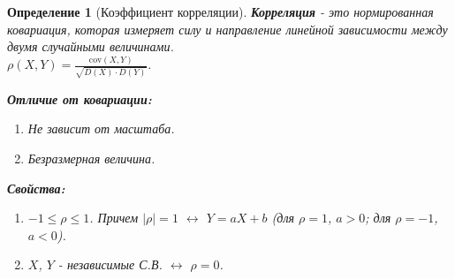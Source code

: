 \documentclass[14pt]{extarticle}
\theoremstyle{breakstyle}
\newtheorem{definition}{Определение}[subsection]
\begin{document}
\begin{definition}[Коэффициент корреляции]

\textbf{Корреляция} - это нормированная ковариация, которая измеряет силу и направление линейной зависимости между двумя случайными величинами.\\
$\rho(X, Y) = \frac{\text{cov}(X, Y)}{\sqrt{D(X) \cdot D(Y)}}$.

\vspace{\baselineskip}

\textbf{Отличие от ковариации:}
\begin{enumerate}
    \item Не зависит от масштаба.
    \item Безразмерная величина.
\end{enumerate}

\vspace{\baselineskip}

\textbf{Свойства:}
\begin{enumerate}
    \item $-1 \leq \rho \leq 1$. Причем $|\rho| = 1$ $\leftrightarrow$ $Y = aX + b$ (для $\rho = 1$, $a > 0$; для $\rho = -1$, $a < 0$).
    \item $X$, $Y$ - независимые С.В. $\leftrightarrow$ $\rho = 0$.
\end{enumerate}

\end{definition}
\end{document}
